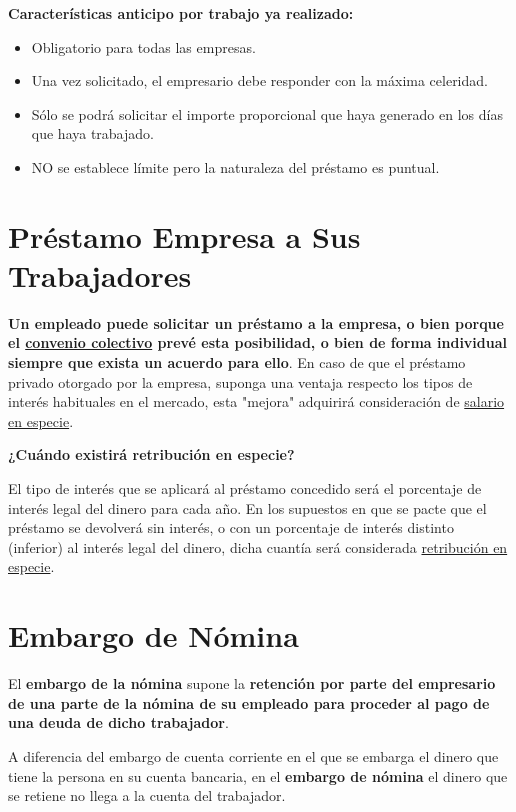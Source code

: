 \documentclass{article}
\begin{document}
	\textbf{Características anticipo por trabajo ya realizado:}
	
	\begin{itemize}
		\item Obligatorio para todas las empresas.
		\item Una vez solicitado, el empresario debe responder con la máxima celeridad.
		\item Sólo se podrá solicitar el importe proporcional que haya generado en los días que haya trabajado.
		\item NO se establece límite pero la naturaleza del préstamo es puntual.
	\end{itemize}
	
	\section*{Préstamo Empresa a Sus Trabajadores}
	
	\textbf{Un empleado puede solicitar un préstamo a la empresa, o bien porque el \underline{convenio colectivo} prevé esta posibilidad, o bien de forma individual siempre que exista un acuerdo para ello}. En caso de que el préstamo privado otorgado por la empresa, suponga una ventaja respecto los tipos de interés habituales en el mercado, esta "mejora" adquirirá consideración de \underline{salario en especie}.
	
	\textbf{¿Cuándo existirá retribución en especie?}
	
	El tipo de interés que se aplicará al préstamo concedido será el porcentaje de interés legal del dinero para cada año. En los supuestos en que se pacte que el préstamo se devolverá sin interés, o con un porcentaje de interés distinto (inferior) al interés legal del dinero, dicha cuantía será considerada \underline{retribución en especie}.
	
	\section*{Embargo de Nómina}
	
	El \textbf{embargo de la nómina} supone la \textbf{retención por parte del empresario de una parte de la nómina de su empleado para proceder al pago de una deuda de dicho trabajador}.
	
	A diferencia del embargo de cuenta corriente en el que se embarga el dinero que tiene la persona en su cuenta bancaria, en el \textbf{embargo de nómina} el dinero que se retiene no llega a la cuenta del trabajador.
	
\end{document}
